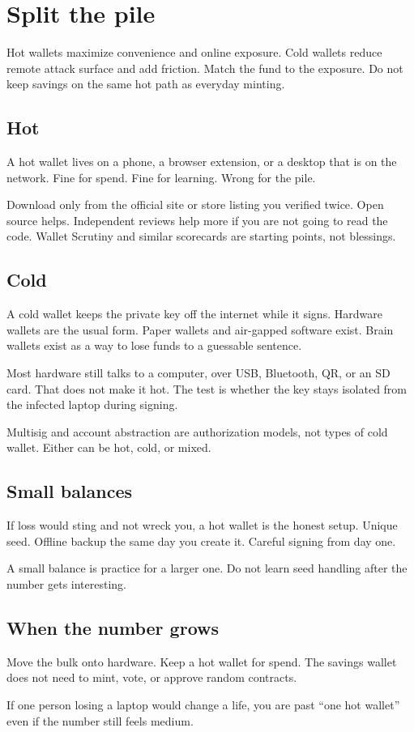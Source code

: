 \chapter{Split the pile}

Hot wallets maximize convenience and online exposure.
Cold wallets reduce remote attack surface and add
friction. Match the fund to the exposure. Do not keep
savings on the same hot path as everyday minting.

\section{Hot}

A hot wallet lives on a phone, a browser extension, or a
desktop that is on the network. Fine for spend. Fine for
learning. Wrong for the pile.

Download only from the official site or store listing
you verified twice. Open source helps. Independent
reviews help more if you are not going to read the code.
Wallet Scrutiny and similar scorecards are starting
points, not blessings.

\section{Cold}

A cold wallet keeps the private key off the internet
while it signs. Hardware wallets are the usual form.
Paper wallets and air-gapped software exist. Brain
wallets exist as a way to lose funds to a guessable
sentence.

Most hardware still talks to a computer, over USB,
Bluetooth, QR, or an SD card. That does not make it hot.
The test is whether the key stays isolated from the
infected laptop during signing.

Multisig and account abstraction are authorization
models, not types of cold wallet. Either can be hot,
cold, or mixed.

\section{Small balances}

If loss would sting and not wreck you, a hot wallet is
the honest setup. Unique seed. Offline backup the same
day you create it. Careful signing from day one.

A small balance is practice for a larger one. Do not
learn seed handling after the number gets interesting.

\section{When the number grows}

Move the bulk onto hardware. Keep a hot wallet for
spend. The savings wallet does not need to mint, vote,
or approve random contracts.

If one person losing a laptop would change a life, you
are past ``one hot wallet'' even if the number still
feels medium.
